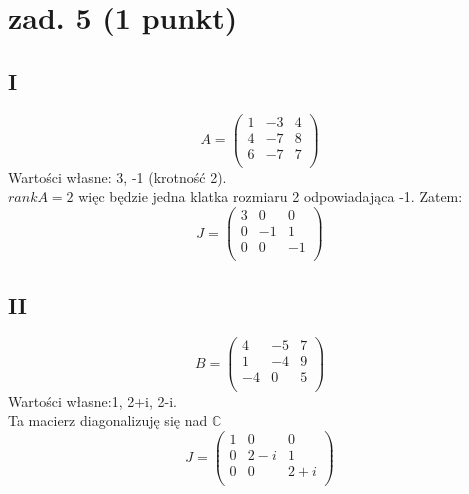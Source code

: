 \documentclass{article}
\begin{document}
\section{zad. 5 (1 punkt)}
\subsection*{I}
$$A =
\begin{pmatrix}
1 & -3 & 4\\
4 & -7 & 8\\
6 & -7 & 7\\
\end{pmatrix}
$$
Wartości własne: 3, -1 (krotność 2).\\
$rank A = 2$ więc będzie jedna klatka rozmiaru 2 odpowiadająca -1. Zatem:
$$J =
\begin{pmatrix}
3 & 0 & 0\\
0 & -1 & 1\\
0 & 0 & -1\\
\end{pmatrix}
$$
\subsection*{II}
$$B =
\begin{pmatrix}
4 & -5 & 7\\
1 & -4 & 9\\
-4 & 0 & 5\\
\end{pmatrix}
$$
Wartości własne:1, 2+i, 2-i.\\
Ta macierz diagonalizuję się nad $\mathbb{C}$
$$J =
\begin{pmatrix}
1 & 0 & 0\\
0 & 2-i & 1\\
0 & 0 & 2+i\\
\end{pmatrix}
$$
\end{document}
